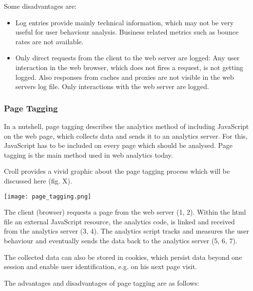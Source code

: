 Some disadvantages are:

\begin{itemize}
\item Log entries provide mainly technical information, which may not be very useful for user behaviour analysis. Business related metrics such as bounce rates are not available. %
\item Only direct requests from the client to the web server are logged: Any user interaction in the web browser, which does not fires a request, is not getting logged. Also responses from caches and proxies are not visible in the web servers log file. Only interactions with the web server are logged.%
\end{itemize}





\subsubsection{Page Tagging}

In a nutshell, page tagging describes the analytics method of including JavaScript on the web page, which collects data and sends it to an analytics server. %
For this, JavaScript has to be included on every page which should be analysed. %
Page tagging is the main method used in web analytics today. %

Croll provides a vivid graphic about the page tagging process which will be discussed here (fig. X). %

\begin{center}
\texttt{[image: page\_tagging.png]}
\end{center}

The client (browser) requests a page from the web server (1, 2).
Within the html file an external JavaScript resource, the analytics code, is linked and received from the analytics server (3, 4).
The analytics script tracks and measures the user behaviour and eventually sends the data back to the analytics server (5, 6, 7).

The collected data can also be stored in cookies, which persist data beyond one session and enable user identification, e.g. on his next page visit. %


The advantages and disadvantages of page tagging are as follows:

